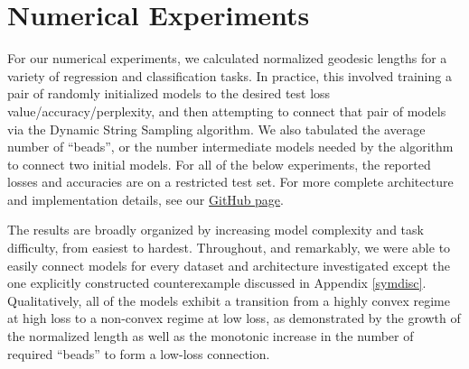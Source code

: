 
 
 
 
 
\section{Numerical Experiments}
\label{sec:NumExp}

For our numerical experiments, we calculated normalized geodesic lengths for a variety of regression and classification tasks.  In practice, this involved training a pair of randomly initialized models to the desired test loss value/accuracy/perplexity, and then attempting to connect that pair of models via the Dynamic String Sampling algorithm.  We also tabulated the average number of ``beads'', or the number intermediate models needed by the algorithm to connect two initial models.  For all of the below experiments, the reported losses and accuracies are on a restricted test set.  For more complete architecture and implementation details, see our \href{github.com/danielfreeman11/convex-nets}{GitHub page}.

The results are broadly organized by increasing model complexity and task difficulty, from easiest to hardest.  Throughout, and remarkably, we were able to easily connect models for every dataset and architecture investigated except the one explicitly constructed counterexample discussed in Appendix \ref{symdisc}.  Qualitatively, all of the models exhibit a transition from a highly convex regime at high loss to a non-convex regime at low loss, as demonstrated by the growth of the normalized length as well as the monotonic increase in the number of required ``beads'' to form a low-loss connection.

